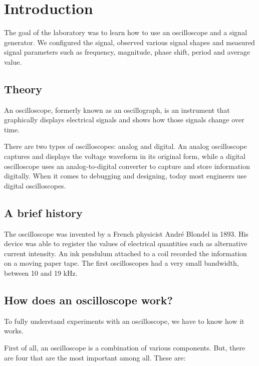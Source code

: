 \section{Introduction}

The goal of the laboratory was to learn how to use an oscilloscope and a signal generator. We configured the signal, observed various signal shapes and measured signal parameters such as frequency, magnitude, phase shift, period and average value.

\subsection*{Theory}

An oscilloscope, formerly known as an oscillograph, is an instrument that graphically displays electrical signals and shows how those signals change over time.

There are two types of oscilloscopes: analog and digital. An analog oscilloscope captures and displays the voltage waveform in its original form, while a digital oscilloscope uses an analog-to-digital converter to capture and store information digitally. When it comes to debugging and designing, today most engineers use digital oscilloscopes.

\subsection*{A brief history}

The oscilloscope was invented by a French physicist André Blondel in 1893. His device was able to register the values of electrical quantities such as alternative current intensity. An ink pendulum attached to a coil recorded the information on a moving paper tape. The first oscilloscopes had a very small bandwidth, between 10 and 19 kHz.

\subsection*{How does an oscilloscope work?}

To fully understand experiments with an oscilloscope, we have to know how it works.

First of all, an oscilloscope is a combination of various components. But, there are four that are the most important among all. These are:

